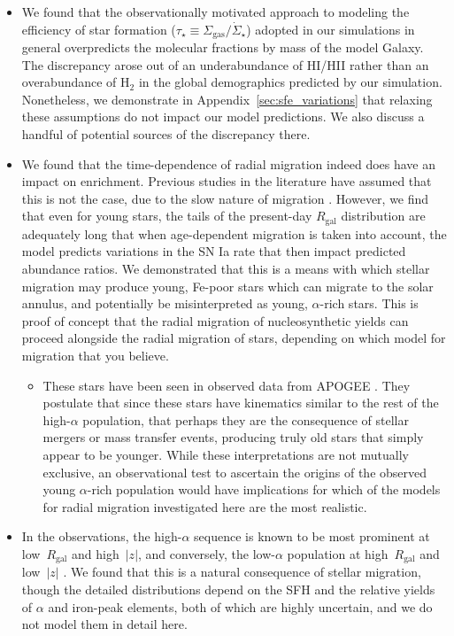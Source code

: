 \documentclass[fleqn, usenatbib]{mnras}
\begin{document}
\begin{itemize}
	\item We found that the observationally motivated approach to modeling the 
	efficiency of star formation ($\tau_\star \equiv \Sigma_\text{gas} / 
	\dot{\Sigma}_\star$) adopted in our simulations in general overpredicts 
	the molecular fractions by mass of the model Galaxy. The discrepancy arose 
	out of an underabundance of HI/HII rather than an overabundance of H$_2$ 
	in the global demographics predicted by our simulation. Nonetheless, we 
	demonstrate in Appendix~\ref{sec:sfe_variations} that relaxing these 
	assumptions do not impact our model predictions. We also discuss a handful 
	of potential sources of the discrepancy there. 

	\item We found that the time-dependence of radial migration indeed does 
	have an impact on enrichment. Previous studies in the literature have 
	assumed that this is not the case, due to the slow nature of migration 
	\citep[e.g.][]{Minchev2013}. However, we find that even for young stars, 
	the tails of the present-day $R_\text{gal}$ distribution are adequately 
	long that when age-dependent migration is taken into account, the model 
	predicts variations in the SN Ia rate that then impact predicted abundance 
	ratios. We demonstrated that this is a means with which stellar migration 
	may produce young, Fe-poor stars which can migrate to the solar annulus, 
	and potentially be misinterpreted as young, $\alpha$-rich stars. This is 
	proof of concept that the radial migration of nucleosynthetic yields can 
	proceed alongside the radial migration of stars, depending on which model 
	for migration that you believe. 
	\begin{itemize} 
		\item These stars have been seen in observed data from APOGEE 
		\citep[e.g.][]{SilvaAguirre2018}. They postulate that since these stars 
		have kinematics similar to the rest of the high-$\alpha$ population, 
		that perhaps they are the consequence of stellar mergers or mass 
		transfer events, producing truly old stars that simply appear to be 
		younger. While these interpretations are not mutually exclusive, an 
		observational test to ascertain the origins of the observed young 
		$\alpha$-rich population would have implications for which of the 
		models for radial migration investigated here are the most realistic. 
	\end{itemize} 

	\item In the observations, the high-$\alpha$ sequence is known to be most 
	prominent at low~$R_\text{gal}$ and high~$\left|z\right|$, and conversely, 
	the low-$\alpha$ population at high~$R_\text{gal}$ and low~$\left|z\right|$ 
	\citep[e.g.][]{Hayden2015}.  We found that this is a natural consequence of 
	stellar migration, though the detailed distributions depend on the SFH and 
	the relative yields of $\alpha$ and iron-peak elements, both of which are 
	highly uncertain, and we do not model them in detail here. 


\end{itemize}
\end{document}
